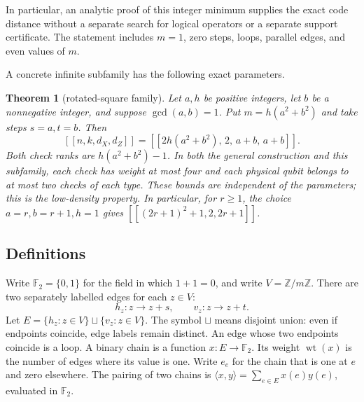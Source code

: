 \documentclass{article}
\newtheorem{theorem}{Theorem}
\numberwithin{equation}{section}
\begin{document}
In particular, an analytic proof of this integer minimum supplies the exact code
distance without a separate search for logical operators or a separate support
certificate. The statement includes \(m=1\), zero steps, loops, parallel edges,
and even values of \(m\).

A concrete infinite subfamily has the following exact parameters.

\begin{theorem}[rotated-square family]\label{thm:family}
  Let \(a,h\)
  be positive integers, let \(b\) be a nonnegative integer, and suppose
  \(\gcd(a,b)=1\). Put \(m=h(a^2+b^2)\) and take steps \(s=a,t=b\). Then
  \begin{equation}\label{eq:family-parameters}
    [[n,k,d_X,d_Z]]=[[2h(a^2+b^2),\,2,\,a+b,\,a+b]].
  \end{equation}
  Both check ranks are \(h(a^2+b^2)-1\). In both the general construction and this
  subfamily, each check has weight at most four and each physical qubit belongs
  to at most two checks of each type. These bounds are independent of the
  parameters; this is the low-density property. In particular, for \(r\ge1\),
  the choice \(a=r,b=r+1,h=1\) gives
  \([[(2r+1)^2+1,2,2r+1]]\).
\end{theorem}

\subsection{Definitions}\label{sec:I-definitions}

Write \(\mathbb F_2=\{0,1\}\) for the field in which \(1+1=0\), and write
\(V=\mathbb Z/m\mathbb Z\). There are two separately labelled edges for each
\(z\in V\):
\begin{equation}\label{eq:edges}
  h_z:z\longrightarrow z+s,\qquad v_z:z\longrightarrow z+t.
\end{equation}
Let \(E=\{h_z:z\in V\}\sqcup\{v_z:z\in V\}\). The symbol \(\sqcup\) means
disjoint union: even if endpoints coincide, edge labels remain distinct. An edge
whose two endpoints coincide is a loop. A binary chain is a function
\(x:E\to\mathbb F_2\). Its weight \(\operatorname{wt}(x)\) is the number of edges
where its value is one. Write \(e_e\) for the chain that is one at \(e\) and zero
elsewhere. The pairing of two chains is
\(\langle x,y\rangle=\sum_{e\in E}x(e)y(e)\), evaluated in \(\mathbb F_2\).
\end{document}
